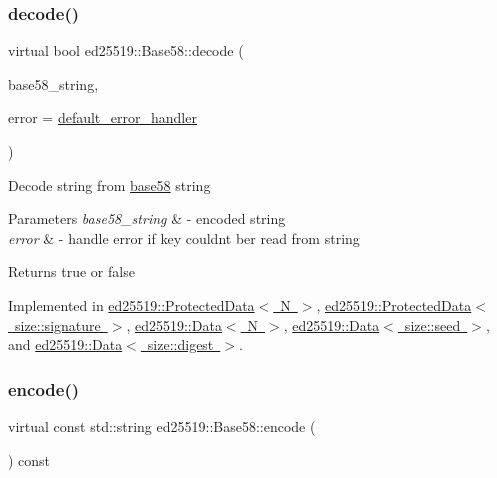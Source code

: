 \subsubsection{\texorpdfstring{decode()}{decode()}}
{\footnotesize\ttfamily virtual bool ed25519\+::\+Base58\+::decode (\begin{DoxyParamCaption}\item[{const std\+::string \&}]{base58\+\_\+string,  }\item[{const \mbox{\hyperlink{namespaceed25519_a6ba572942b3c18591fc869d52a6b16e6}{Error\+Handler}} \&}]{error = {\ttfamily \mbox{\hyperlink{namespaceed25519_a7c7bb6ed17541162959c33ed3e3b15fb}{default\+\_\+error\+\_\+handler}}} }\end{DoxyParamCaption})\hspace{0.3cm}{\ttfamily [pure virtual]}}

Decode string from \mbox{\hyperlink{namespaceed25519_1_1base58}{base58}} string


\begin{DoxyParams}{Parameters}
{\em base58\+\_\+string} & -\/ encoded string \\
\hline
{\em error} & -\/ handle error if key couldn\textquotesingle{}t ber read from string \\
\hline
\end{DoxyParams}
\begin{DoxyReturn}{Returns}
true or false 
\end{DoxyReturn}


Implemented in \mbox{\hyperlink{classed25519_1_1_protected_data_a708852546126e7d19229e247b92a98f6}{ed25519\+::\+Protected\+Data$<$ N $>$}}, \mbox{\hyperlink{classed25519_1_1_protected_data_a708852546126e7d19229e247b92a98f6}{ed25519\+::\+Protected\+Data$<$ size\+::signature $>$}}, \mbox{\hyperlink{classed25519_1_1_data_a281d932d3c3fe7fd40ce86ea7eff559b}{ed25519\+::\+Data$<$ N $>$}}, \mbox{\hyperlink{classed25519_1_1_data_a281d932d3c3fe7fd40ce86ea7eff559b}{ed25519\+::\+Data$<$ size\+::seed $>$}}, and \mbox{\hyperlink{classed25519_1_1_data_a281d932d3c3fe7fd40ce86ea7eff559b}{ed25519\+::\+Data$<$ size\+::digest $>$}}.

\mbox{\label{classed25519_1_1_base58_a1b52a018a5215e2dcf2aa388b0fe06bf}} 
\subsubsection{\texorpdfstring{encode()}{encode()}}
{\footnotesize\ttfamily virtual const std\+::string ed25519\+::\+Base58\+::encode (\begin{DoxyParamCaption}{ }\end{DoxyParamCaption}) const\hspace{0.3cm}{\ttfamily [pure virtual]}}

